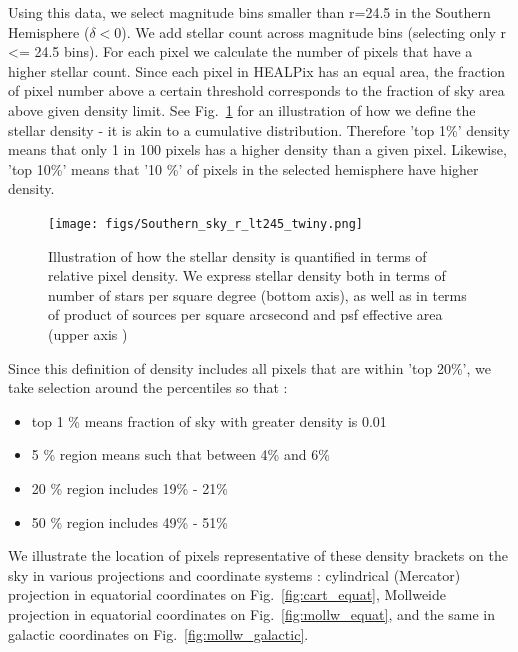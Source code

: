 \documentclass[DM,lsstdraft,toc,usenatbib]{lsstdoc}
\begin{document}
Using this data, we select magnitude bins smaller than r=24.5 in the Southern Hemisphere ($\delta < 0$).  We add stellar count across magnitude bins (selecting only  r <= 24.5 bins).   For each pixel we calculate the number of pixels that have a higher stellar count.  Since each pixel in HEALPix has an equal area, the fraction of pixel number above a certain threshold corresponds to the fraction of sky area above given density limit. See Fig.~\ref{fig:illustrate_density} for an illustration of how we define the stellar density - it is akin to a cumulative distribution. Therefore 'top 1\%' density means that only 1 in 100 pixels has a higher density than a given pixel.  Likewise,  'top 10\%' means that '10 \%' of pixels in the selected hemisphere have higher density. 

\begin{figure}
\texttt{[image: figs/Southern\_sky\_r\_lt245\_twiny.png]}
\caption{Illustration of how the stellar density is quantified in terms of relative pixel density. We express stellar density both in terms of number of stars per square degree (bottom axis), as well as in terms of product of sources per square arcsecond and psf effective area (upper axis )}
\label{fig:illustrate_density}
\end{figure} 


Since this definition of density includes all pixels that are within 'top 20\%', we take selection around the percentiles so that :

\begin{itemize}
\item top  1 \%  means  fraction of sky with greater density is 0.01
\item 5 \% region means such that between  4\% and 6\%
\item 20 \% region  includes   19\% - 21\%
\item 50 \% region includes 49\% - 51\% 
\end{itemize}


We illustrate the location of pixels representative of these density brackets on the sky in various projections  and coordinate systems :  cylindrical (Mercator) projection  in equatorial coordinates on Fig.~\ref{fig:cart_equat},  Mollweide projection in equatorial coordinates on Fig.~\ref{fig:mollw_equat},  and the same in galactic coordinates on Fig.~\ref{fig:mollw_galactic}. 
\end{document}
